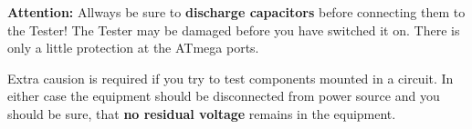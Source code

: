 \vspace{1cm}
\textbf{{\Large Attention:}} Allways be sure to {\bf discharge capacitors} before connecting them to the Tester!
The Tester may be damaged before you have switched it on. There is only a little protection at the ATmega ports.

Extra causion is required if you try to test components mounted in a circuit.
In either case the equipment should be disconnected from power source and you should be sure,
that {\bf no residual voltage} remains in the equipment.

